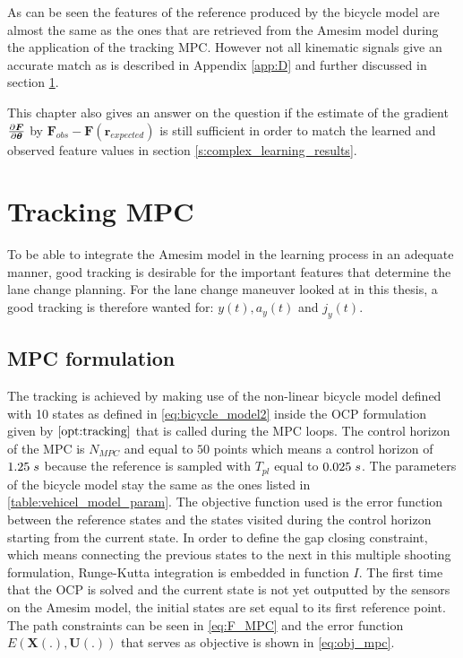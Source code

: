 As can be seen the features of the reference produced by the bicycle model are almost the same as the ones that are retrieved from the Amesim model during the application of the tracking MPC. However not all kinematic signals give an accurate match as is described in Appendix \ref{app:D} and further discussed in section \ref{s:tracking_mpc}. 

This chapter also gives an answer on the question if the estimate of the gradient $\pdv{\bm{F}}{\bm{\theta}}$ by $ \bm{F}_{obs} - \bm{F}(\bm{r}_{expected})$ is still sufficient in order to match the learned and observed feature values in section \ref{s:complex_learning_results}.

\section{Tracking MPC} 
\label{s:tracking_mpc}
To be able to integrate the Amesim model in the learning process in an adequate manner, good tracking is desirable for the important features that determine the lane change planning. For the lane change maneuver looked at in this thesis, a good tracking is therefore wanted for: $y(t), a_y(t)$ and $j_y(t)$.

\subsection{MPC formulation}
The tracking is achieved by making use of the non-linear bicycle model defined with 10 states as defined in \ref{eq:bicycle_model2} inside the OCP formulation given by $\ref{opt:tracking}$ that is called during the MPC loops. The control horizon of the MPC is $N_{MPC}$ and equal to $50$ points which means a control horizon of $1.25 \hspace{1mm}s$ because the reference is sampled with $T_{pl}$ equal to $0.025\hspace{1mm}s$. The parameters of the bicycle model stay the same as the ones listed in \ref{table:vehicel_model_param}. The objective function used is the error function between the reference states and the states visited during the control horizon starting from the current state. In order to define the gap closing constraint, which means connecting the previous states to the next in this multiple shooting formulation, Runge-Kutta integration is embedded in function $I$.  
The first time that the OCP is solved and the current state is not yet outputted by the sensors on the Amesim model, the initial states are set equal to its first reference point. The path constraints can be seen in \ref{eq:F_MPC} and the error function $E(\bm{X}(.),\bm{U}(.))$ that serves as objective is shown in \ref{eq:obj_mpc}.


